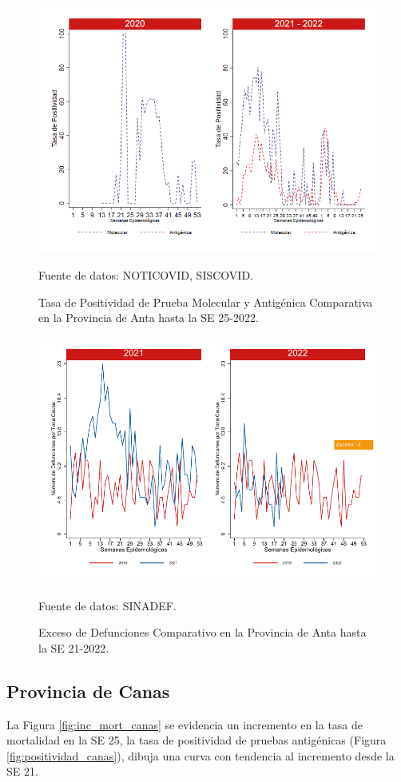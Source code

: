 \documentclass[12pt,a4paper,openany]{book}
\begin{document}
	\begin{figure}[h]
		\caption{Tasa de Positividad de Prueba Molecular y Antigénica Comparativa en la Provincia de Anta hasta la SE 25-2022.}\label{fig:positividad_anta}
		\begin{center}
			\includegraphics[width=0.7\linewidth]{../figuras/positividad_20_21_2.png}
		\end{center}
		{\footnotesize {Fuente de datos: NOTICOVID, SISCOVID.}}
	\end{figure}
	
	\begin{figure}[h]
		\caption{Exceso de Defunciones Comparativo en la Provincia de Anta hasta la SE 21-2022.}\label{fig:exceso_anta}
		\begin{center}
			\includegraphics[width=0.7\linewidth]{../figuras/exceso_2.pdf}
		\end{center}
		{\footnotesize {Fuente de datos: SINADEF.}}
	\end{figure}
	
	\clearpage
	
	\subsection*{Provincia de Canas}
	\noindent La Figura \ref{fig:inc_mort_canas} se evidencia un incremento en la tasa de mortalidad en la SE 25, la tasa de positividad de pruebas antigénicas (Figura \ref{fig:positividad_canas}), dibuja una curva con tendencia al incremento desde la SE 21. 
	
\end{document}
